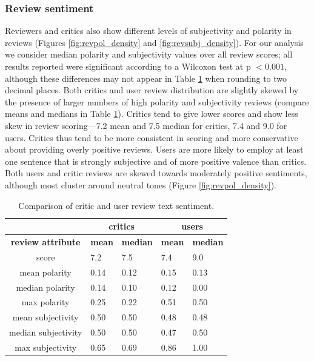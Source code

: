 \documentclass[letterpaper]{article}
\begin{document}
\subsubsection{Review sentiment}
Reviewers and critics also show different levels of subjectivity and polarity in reviews (Figures \ref{fig:revpol_density} and \ref{fig:revsubj_density}). For our analysis we consider median polarity and subjectivity values over all review scores; all results reported were significant according to a Wilcoxon test at p $< 0.001$, although these differences may not appear in Table \ref{tab:review_pol_subj} when rounding to two decimal places. 
Both critics and user review distribution are slightly skewed by the presence of larger numbers of high polarity and subjectivity reviews (compare means and medians in Table \ref{tab:review_pol_subj}). Critics tend to give lower scores and show less skew in review scoring---7.2 mean and 7.5 median for critics, 7.4 and 9.0 for users. Critics thus tend to be more consistent in scoring and more conservative about providing overly positive reviews.
Users are more likely to employ at least one sentence that is strongly subjective and of more positive valence than critics. Both users and critic reviews are skewed towards moderately positive sentiments, although most cluster around neutral tones (Figure \ref{fig:revpol_density}). 

\begin{table}
\scriptsize
\begin{tabularx}{\linewidth}{|c|X|X|X|X|}
\hline  & \multicolumn{2}{|c|}{\textbf{critics}} & \multicolumn{2}{|c|}{\textbf{users}}  \\ 
\hline \textbf{review attribute} & \textbf{mean} & \textbf{median} & \textbf{mean} & \textbf{median} \\ 
\hline score & 7.2 & 7.5 & 7.4 & 9.0 \\ 
\hline mean polarity & 0.14 & 0.12 & 0.15 & 0.13 \\ 
\hline median polarity & 0.14 & 0.10 & 0.12 & 0.00 \\ 
\hline max polarity & 0.25 & 0.22 & 0.51 & 0.50 \\ 
\hline mean subjectivity & 0.50 & 0.50 & 0.48 & 0.48 \\ 
\hline median subjectivity & 0.50 & 0.50 & 0.47 & 0.50 \\ 
\hline max subjectivity & 0.65 & 0.69 & 0.86 & 1.00 \\ 
\hline 
\end{tabularx}
\caption{Comparison of critic and user review text sentiment.}
\label{tab:review_pol_subj}
\end{table} 
\end{document}
